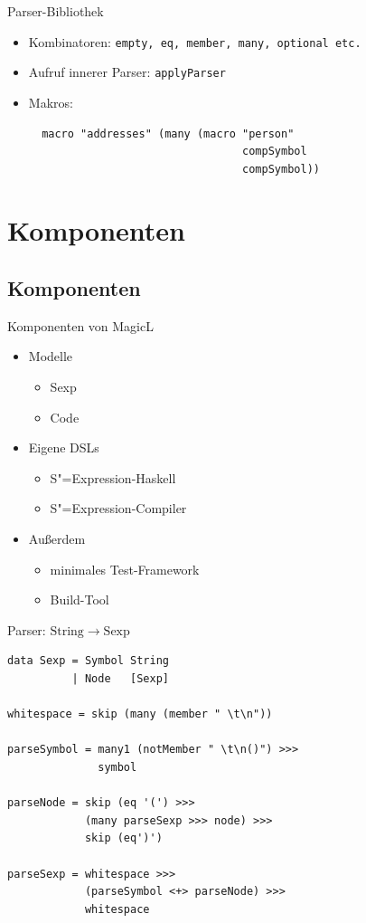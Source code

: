 \documentclass{beamer}
\newcommand{\pfeil}{\item[$\Rightarrow$]}
\newcommand\ato{\rightarrow} %
\newcommand{\sexp}{S"=Expression}
\begin{document}
\begin{frame}[fragile]{Parser-Bibliothek}
  \begin{itemize}
  \item Kombinatoren: \verb+empty, eq, member, many, optional etc.+
  \item Aufruf innerer Parser: \verb+applyParser+
    \pfeil Makros:
\begin{verbatim}
  macro "addresses" (many (macro "person" 
                                 compSymbol 
                                 compSymbol))
\end{verbatim}
  \end{itemize}
\end{frame}

\section{Komponenten}
\subsection{Komponenten}

\begin{frame}{Komponenten von MagicL}
  \begin{itemize}
  \item Modelle
    \begin{itemize}
    \item Sexp
    \item Code
    \end{itemize}
  \item Eigene DSLs
    \begin{itemize}
    \item \sexp{}-Haskell
    \item \sexp{}-Compiler
    \end{itemize}
  \item Außerdem
    \begin{itemize}
    \item minimales Test-Framework
    \item Build-Tool
    \end{itemize}
  \end{itemize}
\end{frame}

\begin{frame}[fragile]{Parser: $\mathrm{String} \ato \mathrm{Sexp}$}
\begin{verbatim}
data Sexp = Symbol String
          | Node   [Sexp]

whitespace = skip (many (member " \t\n"))

parseSymbol = many1 (notMember " \t\n()") >>>
              symbol

parseNode = skip (eq '(') >>> 
            (many parseSexp >>> node) >>> 
            skip (eq')')

parseSexp = whitespace >>> 
            (parseSymbol <+> parseNode) >>> 
            whitespace
\end{verbatim}
\end{frame}
\end{document}
